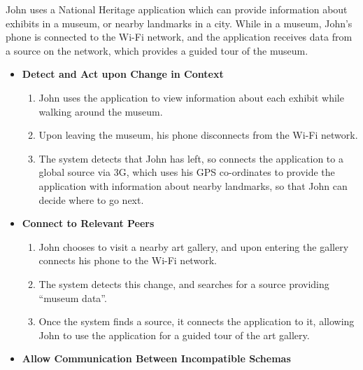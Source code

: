 \documentclass[12pt,twoside,notitlepage]{report}
\begin{document}
John uses a National Heritage application which can provide information about exhibits in a museum, or nearby landmarks in a city. 
While in a museum, John's phone is connected to the Wi-Fi network, and the application receives data from a source on the network, which provides a guided tour of the museum. 

\begin{itemize}

\item {\bf Detect and Act upon Change in Context}

\begin{enumerate}

\item John uses the application to view information about each exhibit while walking around the museum.

\item Upon leaving the museum, his phone disconnects from the Wi-Fi network.

\item The system detects that John has left, so connects the application to a global source via 3G, which uses his GPS co-ordinates to provide the application with information about nearby landmarks, so that John can decide where to go next. 

\end{enumerate}

\item {\bf Connect to Relevant Peers}

\begin{enumerate}

\item John chooses to visit a nearby art gallery, and upon entering the gallery connects his phone to the Wi-Fi network.

\item The system detects this change, and searches for a source providing ``museum data''.

\item Once the system finds a source, it connects the application to it, allowing John to use the application for a guided tour of the art gallery. 

\end{enumerate}

\item {\bf Allow Communication Between Incompatible Schemas}

\begin{enumerate}


\end{enumerate}
\end{itemize}
\end{document}
